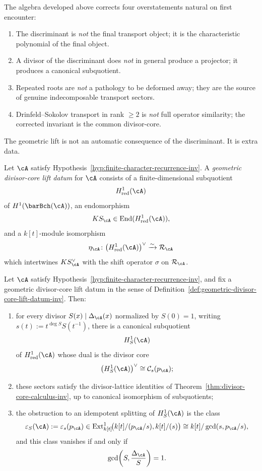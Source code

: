 The algebra developed above corrects four overstatements
natural on first encounter:
\begin{enumerate}[label=\textup{(\arabic*)}]
\item The discriminant is \emph{not} the final transport
 object; it is the characteristic polynomial of the final
 object.
\item A divisor of the discriminant does \emph{not} in general
 produce a projector; it produces a canonical subquotient.
\item Repeated roots are \emph{not} a pathology to be deformed
 away; they are the source of genuine indecomposable
 transport sectors.
\item Drinfeld--Sokolov transport in rank $\geq 2$ is
 \emph{not} full operator similarity; the corrected
 invariant is the common divisor-core.
\end{enumerate}

The geometric lift is not an automatic consequence of the
discriminant. It is extra data.

\begin{definition}
\label{def:geometric-divisor-core-lift-datum-inv}
Let $\cA$ satisfy
Hypothesis~\ref{hyp:finite-character-recurrence-inv}. A
\emph{geometric divisor-core lift datum} for $\cA$ consists of a
finite-dimensional subquotient
\[
H^1_{\mathrm{red}}(\cA)
\]
of $H^1(\barBch(\cA))$, an endomorphism
\[
KS_\cA \in \operatorname{End}(H^1_{\mathrm{red}}(\cA)),
\]
and a $k[t]$-module isomorphism
\[
\eta_\cA\colon
\bigl(H^1_{\mathrm{red}}(\cA)\bigr)^\vee
\xrightarrow{\sim}
\mathcal R_\cA
\]
which intertwines $KS_\cA^\vee$ with the shift operator
$\sigma$ on $\mathcal R_\cA$.
\end{definition}

\begin{theorem}
\label{thm:geometric-lift-datum-consequences-inv}
Let $\cA$ satisfy
Hypothesis~\ref{hyp:finite-character-recurrence-inv}, and fix a
geometric divisor-core lift datum in the sense of
Definition~\ref{def:geometric-divisor-core-lift-datum-inv}. Then:
\begin{enumerate}[label=\textup{(\roman*)}]
\item for every divisor $S(x)\mid \Delta_\cA(x)$ normalized by
 $S(0)=1$, writing $s(t):=t^{\deg S}S(t^{-1})$, there is a
 canonical subquotient
 \[
 H^1_S(\cA)
 \]
 of $H^1_{\mathrm{red}}(\cA)$ whose dual is the divisor core
 \[
 \bigl(H^1_S(\cA)\bigr)^\vee \cong \mathcal C_s(p_\cA);
 \]
\item these sectors satisfy the divisor-lattice identities of
 Theorem~\ref{thm:divisor-core-calculus-inv}, up to canonical
 isomorphism of subquotients;
\item the obstruction to an idempotent splitting of $H^1_S(\cA)$
 is the class
 \[
 \varepsilon_S(\cA):=\varepsilon_s(p_\cA)\in
 \operatorname{Ext}^1_{k[t]}\!\bigl(k[t]/(p_\cA/s),k[t]/(s)\bigr)
 \cong k[t]/\gcd(s,p_\cA/s),
 \]
 and this class vanishes if and only if
 \[
 \gcd\!\left(S,\frac{\Delta_\cA}{S}\right)=1.
 \]
\end{enumerate}
\end{theorem}

